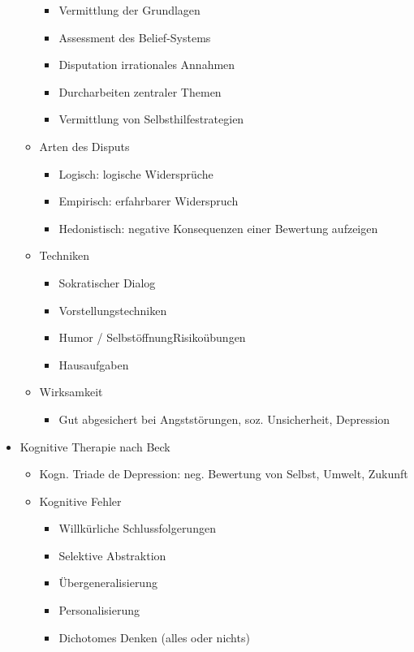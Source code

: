 \documentclass[11pt, paper=a4, twocolumn]{scrartcl}
\begin{document}
\begin{itemize}
\begin{itemize}
						\begin{itemize}
							\item Vermittlung der Grundlagen
							\item Assessment des Belief-Systems
							\item Disputation irrationales Annahmen
							\item Durcharbeiten zentraler Themen
							\item Vermittlung von Selbsthilfestrategien
						\end{itemize}
					\item Arten des Disputs
						\begin{itemize}
							\item Logisch: logische Widersprüche
							\item Empirisch: erfahrbarer Widerspruch
							\item Hedonistisch: negative Konsequenzen einer Bewertung aufzeigen
						\end{itemize}
					\item Techniken
						\begin{itemize}
							\item Sokratischer Dialog
							\item Vorstellungstechniken
							\item Humor / SelbstöffnungRisikoübungen
							\item Hausaufgaben
						\end{itemize}
					\item Wirksamkeit
						\begin{itemize}
							\item Gut abgesichert bei Angststörungen, soz. Unsicherheit, Depression
						\end{itemize}
				\end{itemize}
			\item Kognitive Therapie nach Beck
				\begin{itemize}
					\item Kogn. Triade de Depression: neg. Bewertung von Selbst, Umwelt, Zukunft
					\item Kognitive Fehler
						\begin{itemize}
							\item Willkürliche Schlussfolgerungen
							\item Selektive Abstraktion
							\item Übergeneralisierung
							\item Personalisierung
							\item Dichotomes Denken (alles oder nichts)

\end{itemize}
\end{itemize}
\end{itemize}
\end{document}
